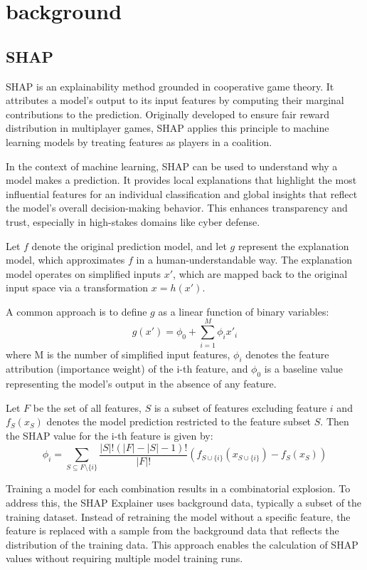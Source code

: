 \section{background}
\label{background}
\subsection{SHAP}

\gls{SHAP} is an explainability method grounded in cooperative game theory. It attributes a model’s output to its input features by computing their marginal contributions to the prediction. Originally developed to ensure fair reward distribution in multiplayer games, SHAP applies this principle to machine learning models by treating features as players in a coalition.

In the context of machine learning, SHAP can be used to understand why a model makes a prediction. It provides local explanations that highlight the most influential features for an individual classification and global insights that reflect the model’s overall decision-making behavior. This enhances transparency and trust, especially in high-stakes domains like cyber defense.

Let $f$ denote the original prediction model, and let $g$ represent the explanation model, which approximates $f$ in a human-understandable way. The explanation model operates on simplified inputs $x'$, which are mapped back to the original input space via a transformation $x = h(x')$. 

A common approach is to define $g$ as a linear function of binary variables:
\begin{equation*}
    g(x') = \phi_{0} + \sum_{i=1}^{M} \phi_{i} x'_{i}
\end{equation*}
where M is the number of simplified input features, $\phi_{i}$ denotes the feature attribution (importance weight) of the i-th feature, and $\phi_{0}$ is a baseline value representing the model's output in the absence of any feature. 

Let $F$ be the set of all features, $S$ is a subset of features excluding feature $i$ and $f_{S}(x_{S})$ denotes the model prediction restricted to the feature subset $S$. Then the SHAP value for the i-th feature is given by:
\begin{equation*}
    \phi_i =
\sum_{S \subseteq F \setminus \{i\}}
\frac{|S|!(|F| - |S| - 1)!}{|F|!}
\left( f_{S \cup \{i\}}(x_{S \cup \{i\}}) - f_S(x_S) \right)
\end{equation*}

Training a model for each combination results in a combinatorial explosion. To address this, the SHAP Explainer uses background data, typically a subset of the training dataset. Instead of retraining the model without a specific feature, the feature is replaced with a sample from the background data that reflects the distribution of the training data. This approach enables the calculation of SHAP values without requiring multiple model training runs.